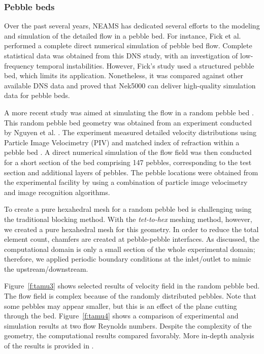 \subsubsection{Pebble beds}

Over the past several years, NEAMS has dedicated several efforts to the modeling and simulation of the detailed flow in a pebble bed. For instance, Fick et al. \cite{fick2017direct}  performed a complete direct numerical simulation of pebble bed flow. Complete statistical data was obtained from this DNS study, with an investigation of low-frequency temporal instabilities. However, Fick's study \cite{fick2017direct} used a structured pebble bed, which limits its application. Nonetheless, it was compared against other available DNS data and proved that Nek5000 can deliver high-quality simulation data for pebble beds.

A more recent study was aimed at simulating the flow in a random pebble bed \cite{yildiz2020direct}. This random pebble bed geometry was obtained from an experiment conducted by Nguyen et al. \cite{nguyen2018time}.  The experiment measured detailed velocity distributions using Particle Image Velocimetry (PIV) and matched index of refraction within a pebble bed . A direct numerical simulation of the flow field was then conducted for a short section of the bed comprising 147 pebbles, corresponding to the test section and additional layers of pebbles. The pebble locations were obtained from the experimental facility by using a combination of particle image velocimetry and image recognition algorithms.

To create a pure hexahedral mesh for a random pebble bed is challenging using the traditional blocking method. With the \textit{tet-to-hex} meshing method, however, we created a pure hexahedral mesh for this geometry. In order to reduce the total element count, chamfers are created at pebble-pebble interfaces. As discussed, the computational domain is only a small section of the whole experimental domain; therefore, we applied periodic boundary conditions at the inlet/outlet to mimic the upstream/downstream.

Figure~\ref{f:tamu3} shows selected results of velocity field in the random pebble bed. The flow field is complex because of the randomly distributed pebbles. Note that some pebbles may appear smaller, but this is an effect of the plane cutting through the bed. Figure~\ref{f:tamu4} shows a comparison of experimental and simulation results at two flow Reynolds numbers. Despite the complexity of the geometry, the computational results compared favorably. More in-depth analysis of the results is provided in \cite{yildiz2020direct}.

